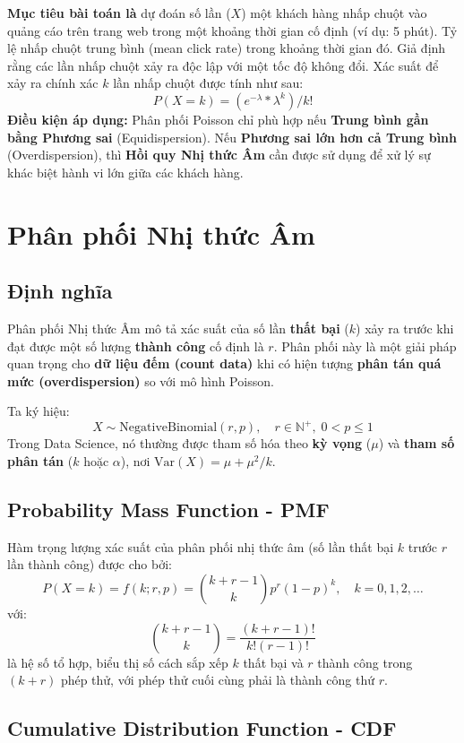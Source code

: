\textbf{Mục tiêu bài toán là} dự đoán số lần ($X$) một khách hàng nhấp chuột vào quảng cáo trên trang web trong một khoảng thời gian cố định (ví dụ: 5 phút).
 Tỷ lệ nhấp chuột trung bình (mean click rate) trong khoảng thời gian đó.
 Giả định rằng các lần nhấp chuột xảy ra độc lập với một tốc độ không đổi.
Xác suất để xảy ra chính xác $k$ lần nhấp chuột được tính như sau:
    $$
        P(X=k) = (e^{-\lambda} * \lambda^k) / k!
    $$
 \textbf{Điều kiện áp dụng:} Phân phối Poisson chỉ phù hợp nếu
 \textbf{Trung bình gần bằng Phương sai} (Equidispersion). 
 Nếu \textbf{Phương sai lớn hơn cả Trung bình} (Overdispersion), thì
 \textbf{Hồi quy Nhị thức Âm} cần được sử dụng để xử lý sự khác biệt hành vi lớn giữa các khách hàng.

\section{Phân phối Nhị thức Âm}

\subsection{Định nghĩa}

Phân phối Nhị thức Âm mô tả xác suất của số lần \textbf{thất bại} ($k$) xảy ra trước khi đạt được một số lượng \textbf{thành công} cố định là $r$. Phân phối này là một giải pháp quan trọng cho \textbf{dữ liệu đếm (count data)} khi có hiện tượng \textbf{phân tán quá mức (overdispersion)} so với mô hình Poisson.

Ta ký hiệu:
\[
X \sim \mathrm{NegativeBinomial}(r, p), \quad r \in \mathbb{N}^+, \; 0 < p \leq 1
\]
Trong Data Science, nó thường được tham số hóa theo \textbf{kỳ vọng} ($\mu$) và \textbf{tham số phân tán} ($k$ hoặc $\alpha$), nơi $\mathrm{Var}(X) = \mu + \mu^2 / k$.

\subsection{Probability Mass Function - PMF}

Hàm trọng lượng xác suất của phân phối nhị thức âm (số lần thất bại $k$ trước $r$ lần thành công) được cho bởi:
\[
P(X = k) = f(k; r, p) = \binom{k + r - 1}{k} p^r (1 - p)^{k}, \quad k = 0, 1, 2, \dots
\]
với:
\[
\binom{k + r - 1}{k} = \frac{(k + r - 1)!}{k!(r - 1)!}
\]
là hệ số tổ hợp, biểu thị số cách sắp xếp $k$ thất bại và $r$ thành công trong $(k+r)$ phép thử, với phép thử cuối cùng phải là thành công thứ $r$.

\subsection{Cumulative Distribution Function - CDF}

